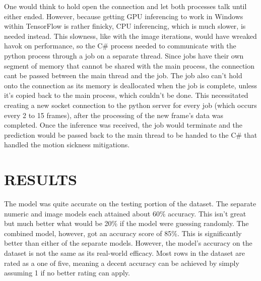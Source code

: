 One would think to hold open the connection and let both processes talk until either ended.
However, because getting GPU inferencing to work in Windows within TensorFlow is rather finicky, CPU inferencing, which is much slower, is needed instead.
This slowness, like with the image iterations, would have wreaked havok on performance, so the C\# process needed to communicate with the python process through a job on a separate thread.
Since jobs have their own segment of memory that cannot be shared with the main process, the connection cant be passed between the main thread and the job.
The job also can't hold onto the connection as its memory is deallocated when the job is complete, unless it's copied back to the main process, which couldn't be done.
This necessitated creating a new socket connection to the python server for every job (which occurs every 2 to 15 frames), after the processing of the new frame's data was completed.
Once the inference was received, the job would terminate and the prediction would be passed back to the main thread to be handed to the C\# that handled the motion sickness mitigations.

\chapter{RESULTS}
\label{ch:results}

The model was quite accurate on the testing portion of the dataset.
The separate numeric and image models each attained about 60\% accuracy.
This isn't great but much better what would be 20\% if the model were guessing randomly.
The combined model, however, got an accuracy score of 85\%.
This is significantly better than either of the separate models.
However, the model's accuracy on the dataset is not the same as its real-world efficacy.
Most rows in the dataset are rated as a one of five, meaning a decent accuracy can be achieved by simply assuming 1 if no better rating can apply.

